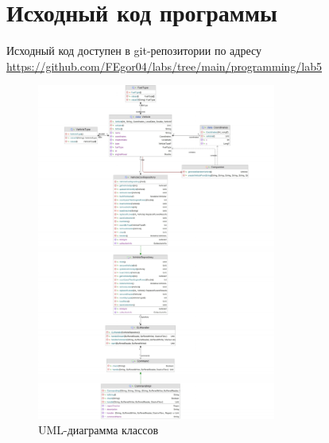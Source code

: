 \section{Исходный код программы}
Исходный код доступен в git-репозитории по адресу \url{https://github.com/FEgor04/labs/tree/main/programming/lab5}

\begin{figure}[ht]
    \centering
    \includegraphics[width=0.7\textwidth]{img/uml.pdf}
    \caption{UML-диаграмма классов}
\end{figure}